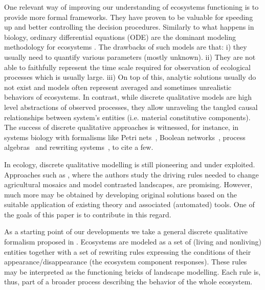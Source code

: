\documentclass[a4paper,twoside]{article}
\begin{document}

One relevant way of improving our understanding of ecosystems functioning  is to provide more formal frameworks. 
They have proven to be valuable for speeding up and better controlling the decision procedures. 
%	
Similarly to what happens in biology, ordinary differential equations (ODE) are the dominant modeling methodology for ecosystems \cite{may72, Lotka1925}. 
The drawbacks of such  models are that: i) they usually need to quantify various parameters (mostly unknown). ii) They are not able to faithfully represent the time scale required for observation of ecological processes which is usually large. 
iii) On top of this,   analytic solutions usually do not exist and models often represent averaged and sometimes unrealistic behaviors of ecosystems. 
In contrast, while discrete qualitative models are high level abstractions of observed processes, they allow unraveling the tangled causal relationships between system's entities (i.e. material constitutive components). 
The success of discrete qualitative approaches is witnessed, for instance,  in systems biology with formalisms like Petri
 nets~\cite{DBLP:journals/nc/BaldanCMS10}, Boolean networks~\cite{thomas1973boolean},
 process algebras~\cite{journals/tcsb/Cardelli05} and rewriting systems~\cite{giavitto04a}, to cite a few. 

In ecology, discrete qualitative modelling is still pioneering and under exploited. 
Approaches such as \cite{gaucherel2012,gaucherel2014}, where the authors study the driving rules needed to change agricultural mosaics and model contrasted landscapes, are promising. However, much more may be obtained
by developing original solutions based on the suitable application of existing theory and associated (automated) tools. 
One of the goals of this paper is to contribute in this regard. 

As a starting point of our developments we take a general discrete qualitative formalism proposed in   \cite{pommereau-gaucherel2017}. Ecosystems are modeled 
as a set of (living and nonliving) entities together with a set of rewriting rules expressing the conditions of their appearance/disappearance (\ie the ecosystem component responses).  
These rules  may be interpreted as the functioning bricks of landscape modelling. 
Each rule is, thus, part of a broader process describing the behavior of the whole ecosystem. 
\end{document}
